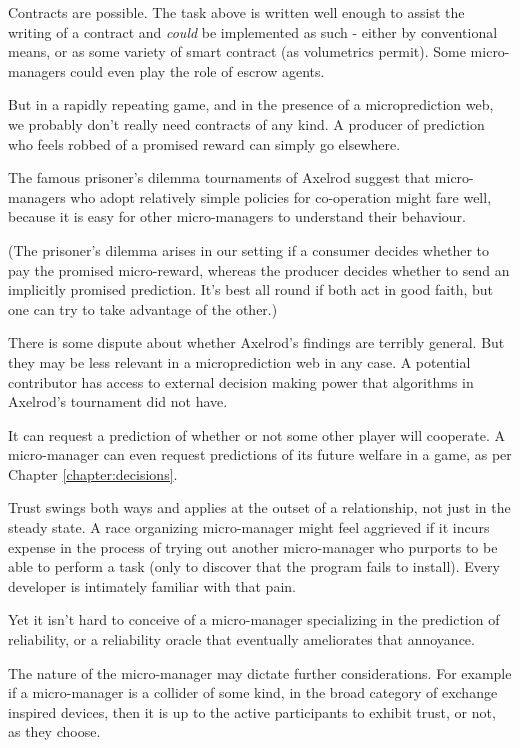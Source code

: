 Contracts are possible. The task above is written well enough to assist the writing of a contract and {\em could} be implemented as such - either by conventional means, or as some variety of smart contract (as volumetrics permit). Some micro-managers could even play the role of escrow agents.  

But in a rapidly repeating game, and in the presence of a microprediction web, we probably don't really need contracts of any kind. A producer of prediction who feels robbed of a promised reward can simply go elsewhere. 

The famous prisoner's dilemma tournaments of Axelrod suggest that micro-managers who adopt relatively simple policies for co-operation might fare well, because it is easy for other micro-managers to understand their behaviour. 

(The prisoner's dilemma arises in our setting if a consumer decides whether to pay the promised micro-reward, whereas the producer decides whether to send an implicitly promised prediction. It's best all round if both act in good faith, but one can try to take advantage of the other.) 

There is some dispute about whether Axelrod's findings are terribly general. But they may be less relevant in a microprediction web in any case. A potential contributor has access to external decision making power that algorithms in Axelrod's tournament did not have. 

It can request a prediction of whether or not some other player will cooperate. A micro-manager can even request predictions of its future welfare in a game, as per Chapter \ref{chapter:decisions}. 

Trust swings both ways and applies at the outset of a relationship, not just in the steady state. A race organizing micro-manager might feel aggrieved if it incurs expense in the process of trying out another micro-manager who purports to be able to perform a task (only to discover that the program fails to install). Every developer is intimately familiar with that pain.  

Yet it isn't hard to conceive of a micro-manager specializing in the prediction of reliability, or a reliability oracle that eventually ameliorates that annoyance. 


The nature of the micro-manager may dictate further considerations. For example if a micro-manager is a collider of some kind, in the broad category of exchange inspired devices, then it is up to the active participants to exhibit trust, or not, as they choose. 
 

